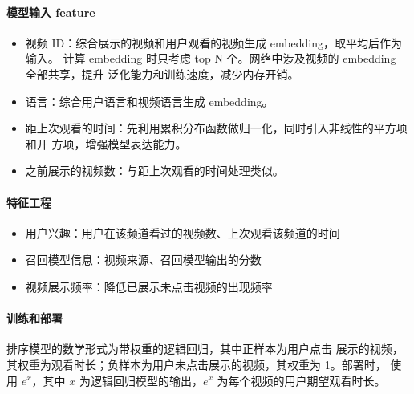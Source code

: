 \paragraph{模型输入 feature}
\begin{itemize}
  \item 视频 ID：综合展示的视频和用户观看的视频生成 embedding，取平均后作为输入。
    计算 embedding 时只考虑 top N 个。网络中涉及视频的 embedding 全部共享，提升
    泛化能力和训练速度，减少内存开销。
  \item 语言：综合用户语言和视频语言生成 embedding。
  \item 距上次观看的时间：先利用累积分布函数做归一化，同时引入非线性的平方项和开
    方项，增强模型表达能力。
  \item 之前展示的视频数：与距上次观看的时间处理类似。
\end{itemize}

\paragraph{特征工程}
\begin{itemize}
  \item 用户兴趣：用户在该频道看过的视频数、上次观看该频道的时间
  \item 召回模型信息：视频来源、召回模型输出的分数
  \item 视频展示频率：降低已展示未点击视频的出现频率
\end{itemize}

\paragraph{训练和部署} 排序模型的数学形式为带权重的逻辑回归，其中正样本为用户点击
展示的视频，其权重为观看时长；负样本为用户未点击展示的视频，其权重为 1。部署时，
使用 $e^{x}$，其中 $x$ 为逻辑回归模型的输出，$e^x$ 为每个视频的用户期望观看时长。

